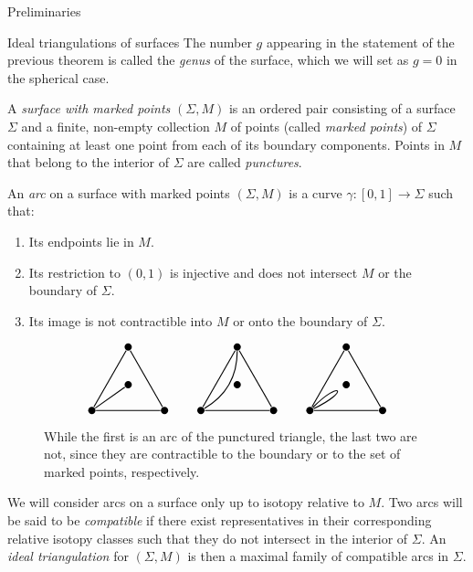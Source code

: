 \begin{chapter}{Preliminaries}
\begin{section}{Ideal triangulations of surfaces}
The number $g$ appearing in the statement of the previous theorem is called the \emph{genus} of the surface, which we will set as $g=0$ in the spherical case.

A \emph{surface with marked points} $(\Sigma,M)$ is an ordered pair consisting of a surface $\Sigma$ and a finite, non-empty collection $M$ of points (called \emph{marked points}) of $\Sigma$ containing at least one point from each of its boundary components. Points in $M$ that belong to the interior of $\Sigma$ are called \emph{punctures}.

An \emph{arc} on a surface with marked points $(\Sigma, M)$ is a curve $\gamma:[0,1]\to \Sigma$ such that:
\begin{enumerate}
\item Its endpoints lie in $M$.
\item Its restriction to $(0,1)$ is injective and does not intersect $M$ or the boundary of $\Sigma$.
\item Its image is not contractible into $M$ or onto the boundary of $\Sigma$.
\end{enumerate}
\begin{figure}[h]
\[
\begin{tikzpicture}[thick]
\tikzstyle{every node} = [circle, fill=black, minimum size=.2cm, inner sep=0cm]
\node (se1) at (0,0) {};
\node (sw1) at (2,0) {}
	edge (se1);
\node (n1) at (1,1.73) {}
	edge (se1)
	edge (sw1);
\node (c1) at (1,0.7) {}
	edge (se1);

\node (se2) at (3,0) {};
\node (sw2) at (5,0) {}
	edge (se2);
\node (n2) at (4,1.73) {}
	edge (se2)
	edge (sw2)
	edge [bend left] (se2);
\node (c2) at (4,0.7) {};

\node (se3) at (6,0) {}
	edge [in=25, out=45, distance=1.1cm] (se3);
\node (sw3) at (8,0) {}
	edge (se3);
\node (n3) at (7,1.73) {}
	edge (se3)
	edge (sw3);
\node (c3) at (7,0.7) {};
\end{tikzpicture}
\]
\caption{While the first is an arc of the punctured triangle, the last two are not, since they are contractible to the boundary or to the set of marked points, respectively.}
\end{figure}

We will consider arcs on a surface only up to isotopy relative to $M$. Two arcs will be said to be \emph{compatible} if there exist representatives in their corresponding relative isotopy classes such that they do not intersect in the interior of $\Sigma$. An \emph{ideal triangulation} for $(\Sigma, M)$ is then a maximal family of compatible arcs in $\Sigma$.


\end{section}
\end{chapter}
